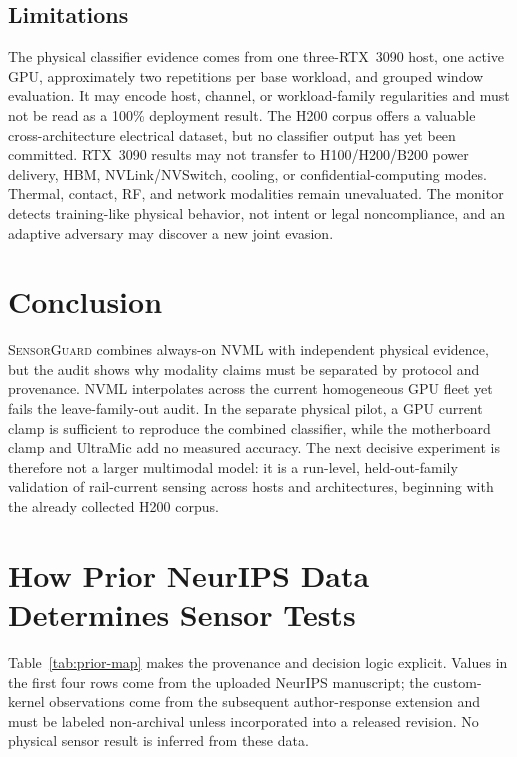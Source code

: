 \documentclass[sigplan,anonymous,review,nonacm]{acmart}
\newif\ifshowplan
\newcommand{\system}{\textsc{SensorGuard}}
\begin{document}
\subsection{Limitations}

The physical classifier evidence comes from one three-RTX~3090 host, one active GPU, approximately two repetitions per base workload, and grouped window evaluation. It may encode host, channel, or workload-family regularities and must not be read as a 100\% deployment result. The H200 corpus offers a valuable cross-architecture electrical dataset, but no classifier output has yet been committed. RTX~3090 results may not transfer to H100/H200/B200 power delivery, HBM, NVLink/NVSwitch, cooling, or confidential-computing modes. Thermal, contact, RF, and network modalities remain unevaluated. The monitor detects training-like physical behavior, not intent or legal noncompliance, and an adaptive adversary may discover a new joint evasion.

\section{Conclusion}

\system{} combines always-on NVML with independent physical evidence, but the audit shows why modality claims must be separated by protocol and provenance. NVML interpolates across the current homogeneous GPU fleet yet fails the leave-family-out audit. In the separate physical pilot, a GPU current clamp is sufficient to reproduce the combined classifier, while the motherboard clamp and UltraMic add no measured accuracy. The next decisive experiment is therefore not a larger multimodal model: it is a run-level, held-out-family validation of rail-current sensing across hosts and architectures, beginning with the already collected H200 corpus.

\ifshowplan
\appendix
\onecolumn
\section{How Prior NeurIPS Data Determines Sensor Tests}
\label{app:prior}

Table~\ref{tab:prior-map} makes the provenance and decision logic explicit. Values in the first four rows come from the uploaded NeurIPS manuscript; the custom-kernel observations come from the subsequent author-response extension and must be labeled non-archival unless incorporated into a released revision. No physical sensor result is inferred from these data.
\end{document}
